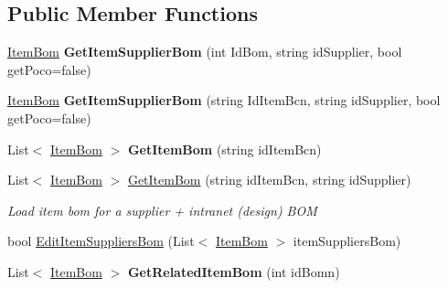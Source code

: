 \subsection*{Public Member Functions}
\begin{DoxyCompactItemize}
\item 
\mbox{\label{class_h_k_supply_1_1_services_1_1_implementations_1_1_e_f_item_bom_aa82900565abed0109b8ecd45d8c3c1d9}} 
\mbox{\hyperlink{class_h_k_supply_1_1_models_1_1_item_bom}{Item\+Bom}} {\bfseries Get\+Item\+Supplier\+Bom} (int Id\+Bom, string id\+Supplier, bool get\+Poco=false)
\item 
\mbox{\label{class_h_k_supply_1_1_services_1_1_implementations_1_1_e_f_item_bom_a07dec38f619eac3d606e1511c912cc9e}} 
\mbox{\hyperlink{class_h_k_supply_1_1_models_1_1_item_bom}{Item\+Bom}} {\bfseries Get\+Item\+Supplier\+Bom} (string Id\+Item\+Bcn, string id\+Supplier, bool get\+Poco=false)
\item 
\mbox{\label{class_h_k_supply_1_1_services_1_1_implementations_1_1_e_f_item_bom_a5a962745957fb57c7b2f4a4b6bfc67de}} 
List$<$ \mbox{\hyperlink{class_h_k_supply_1_1_models_1_1_item_bom}{Item\+Bom}} $>$ {\bfseries Get\+Item\+Bom} (string id\+Item\+Bcn)
\item 
List$<$ \mbox{\hyperlink{class_h_k_supply_1_1_models_1_1_item_bom}{Item\+Bom}} $>$ \mbox{\hyperlink{class_h_k_supply_1_1_services_1_1_implementations_1_1_e_f_item_bom_a11dbd453a2f553e3e00e163a846397e6}{Get\+Item\+Bom}} (string id\+Item\+Bcn, string id\+Supplier)
\begin{DoxyCompactList}\small\item\em Load item bom for a supplier + intranet (design) B\+OM \end{DoxyCompactList}\item 
bool \mbox{\hyperlink{class_h_k_supply_1_1_services_1_1_implementations_1_1_e_f_item_bom_a66d0c1f604104f7e54d059db6423ceb3}{Edit\+Item\+Suppliers\+Bom}} (List$<$ \mbox{\hyperlink{class_h_k_supply_1_1_models_1_1_item_bom}{Item\+Bom}} $>$ item\+Suppliers\+Bom)
\item 
\mbox{\label{class_h_k_supply_1_1_services_1_1_implementations_1_1_e_f_item_bom_a7987eb32318d435127baa58f74af72d9}} 
List$<$ \mbox{\hyperlink{class_h_k_supply_1_1_models_1_1_item_bom}{Item\+Bom}} $>$ {\bfseries Get\+Related\+Item\+Bom} (int id\+Bomn)
\end{DoxyCompactItemize}


